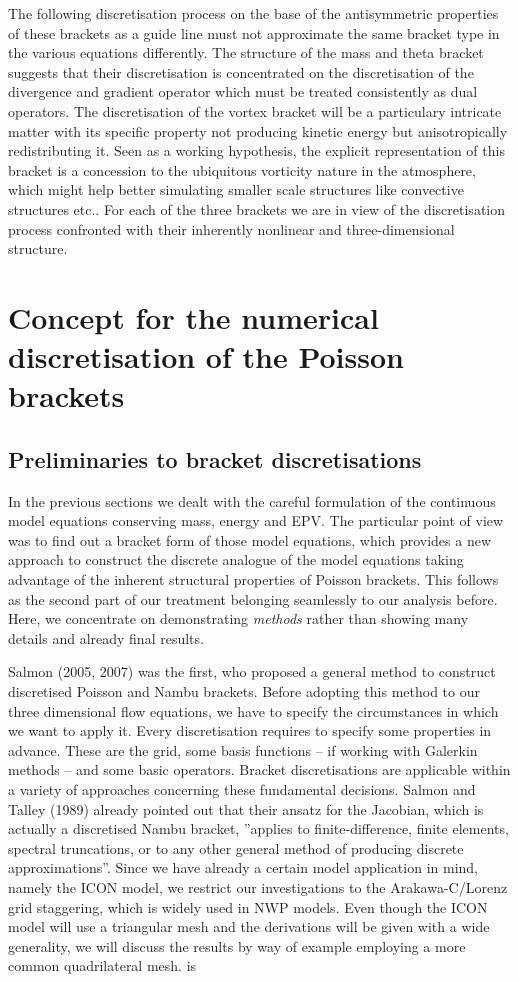 The following discretisation process on the base of the antisymmetric properties of these brackets as a guide line must not approximate the same bracket type in the various equations differently. The structure of the mass and theta bracket suggests that their discretisation is concentrated on the discretisation of the divergence and gradient operator  which must be treated consistently as dual operators. The discretisation of the vortex bracket will be a particulary intricate matter with its specific property not producing kinetic energy but anisotropically redistributing it. Seen as a working hypothesis, the explicit representation of this bracket is a concession to the ubiquitous vorticity nature in the atmosphere, which might help better simulating smaller scale structures like convective structures etc.. For each of the three brackets we are in view of the discretisation process confronted with their inherently nonlinear and three-dimensional structure.

\section{Concept for the numerical discretisation of the Poisson brackets}

\subsection{Preliminaries to bracket discretisations}
In the previous sections we dealt with the careful formulation of the continuous model equations conserving mass, energy and EPV. The particular point of view was to find out a bracket form of those model equations, which provides a new approach to construct the discrete analogue of the model equations taking advantage of the inherent structural properties of Poisson brackets. This follows as the second part of our treatment belonging seamlessly to our analysis before. Here, we concentrate on demonstrating \textit{methods} rather than showing many details and already final results.

Salmon (2005, 2007) was the first, who proposed a general method to construct discretised Poisson and Nambu brackets. Before adopting this method to our three dimensional flow equations, we have to specify the circumstances in which we want to apply it. Every discretisation requires to specify some properties in advance. These are the grid, some basis functions -- if working with Galerkin methods -- and some basic operators. Bracket discretisations are applicable within a variety of approaches concerning these fundamental decisions. Salmon and Talley (1989) already pointed out that their ansatz for the Jacobian, which is actually a discretised Nambu bracket, ''applies to finite-difference, finite elements, spectral truncations, or to any other general method of producing discrete approximations''. Since we have already a certain model application in mind, namely the ICON model, we restrict our investigations to the Arakawa-C/Lorenz grid staggering, which is widely used in NWP models. Even though the ICON model will use a triangular mesh and the derivations will be given with a wide generality, we will discuss the results by way of example employing a more common quadrilateral mesh.
is

